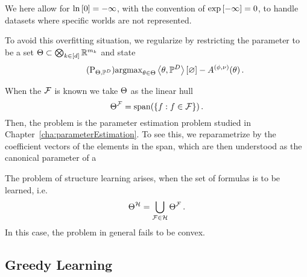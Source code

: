 We here allow for $\ln \left[ 0 \right]=-\infty$, with the convention of $\mathrm{exp}\left[-\infty\right]=0$, to handle datasets where specific worlds are not represented. 


To avoid this overfitting situation, we regularize by restricting the parameter to be a set $\Theta\subset\bigotimes_{k\in[d]} \mathbb{R}^{m_{k}}$ and state
\begin{align}\tag{$\mathrm{P}_{\energyhypothesis, \empdistribution}$}\label{prob:restrictedNaiveMLE}
	\argmax_{\canparam\in\energyhypothesis}  \sbcontraction{\canparam,\empdistribution} - \cumfunctionof{\canparam} \, . 
\end{align}

When the $\mathcal{F}$ is known we take $\Theta$ as the linear hull 
	\[ \Theta^{\mathcal{F}} = \mathrm{span}(\{f : f\in\mathcal{F} \}) \, . \]
Then, the problem is the parameter estimation problem studied in Chapter~\ref{cha:parameterEstimation}.
To see this, we reparametrize by the coefficient vectors of the elements in the span, which are then understood as the canonical parameter of a 

The problem of structure learning arises, when the set of formulas is to be learned, i.e. 
	\[ \Theta^{\mathcal{H}}= \bigcup_{\mathcal{F}\in\mathcal{H}} \Theta^{\mathcal{F}}\, .  \]
In this case, the problem in general fails to be convex.


\subsection{Greedy Learning}


%


